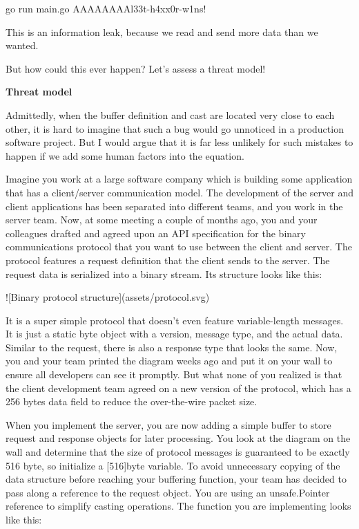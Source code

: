 go run main.go
AAAAAAAAl33t-h4xx0r-w1ns!

This is an information leak, because we read and send more data than we wanted.

But how could this ever happen? Let's assess a threat model!


\textbf{Threat model}

Admittedly, when the buffer definition and cast are located very close to each other, it is hard to imagine that such
a bug would go unnoticed in a production software project. But I would argue that it is far less unlikely for such
mistakes to happen if we add some human factors into the equation.

Imagine you work at a large software company which is building some application that has a client/server communication
model. The development of the server and client applications has been separated into different teams, and you work in
the server team. Now, at some meeting a couple of months ago, you and your colleagues drafted and agreed upon an API
specification for the binary communications protocol that you want to use between the client and server. The protocol
features a request definition that the client sends to the server. The request data is serialized into a binary stream.
Its structure looks like this:

![Binary protocol structure](assets/protocol.svg)

It is a super simple protocol that doesn't even feature variable-length messages. It is just a static byte object with
a version, message type, and the actual data. Similar to the request, there is also a response type that looks the same.
Now, you and your team printed the diagram weeks ago and put it on your wall to ensure all developers can see it promptly.
But what none of you realized is that the client development team agreed on a new version of the protocol, which has a
256 bytes data field to reduce the over-the-wire packet size.

When you implement the server, you are now adding a simple buffer to store request and response objects for later
processing. You look at the diagram on the wall and determine that the size of protocol messages is guaranteed to be
exactly 516 byte, so initialize a [516]byte variable. To avoid unnecessary copying of the data structure before
reaching your buffering function, your team has decided to pass along a reference to the request object. You are using
an unsafe.Pointer reference to simplify casting operations. The function you are implementing looks like this:

